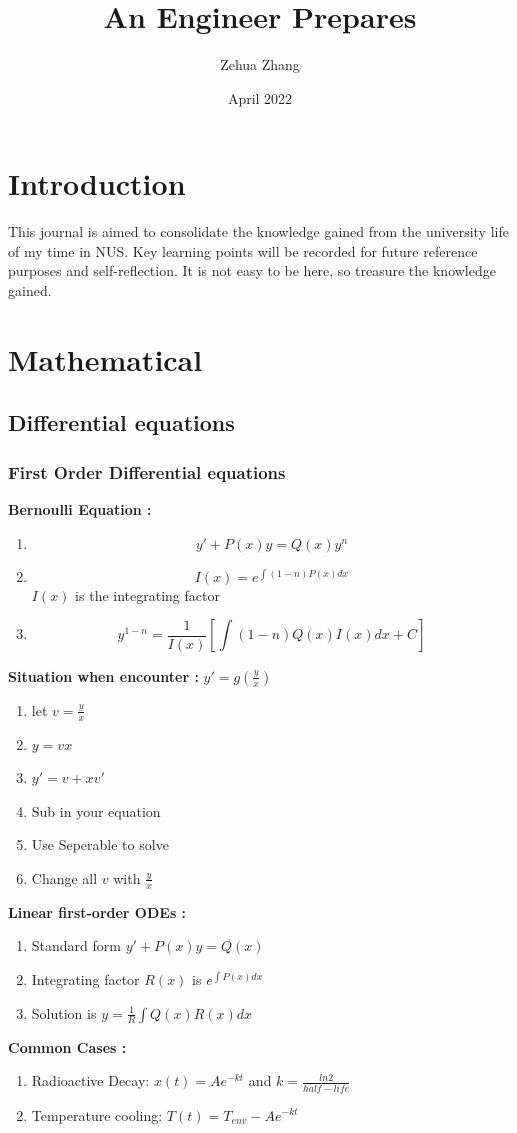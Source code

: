 \documentclass{article}
\title{An Engineer Prepares}
\author{Zehua Zhang}
\date{April 2022}
\begin{document}
\maketitle
\newpage
\tableofcontents

\newpage
\section*{Introduction}
This journal is aimed to consolidate the knowledge gained from the university life of my time in NUS. Key learning points will be recorded for future reference purposes and self-reflection. It is not easy to be here, so treasure the knowledge gained.


\section{Mathematical}
\subsection{Differential equations}
\subsubsection{First Order Differential equations}
\textbf{Bernoulli Equation :}
\begin{enumerate} 
    \item\[y'+ P(x)y = Q(x) y^n\]
    \item\[I(x)= e^{\int(1-n)P(x)dx}\]
$I(x)$ is the integrating factor
    \item\[y^{1-n}=\frac{1}{I(x)}\left[\int(1-n)Q(x)I(x)dx + C\right]\]
\end{enumerate}
\textbf{Situation when encounter :} $y'=g(\frac{y}{x})$
\begin{enumerate}
    \item let $v=\frac{y}{x}$
    \item $y = vx$
    \item $y'=v+xv'$
    \item Sub in your equation
    \item Use Seperable to solve
    \item Change all $v$ with $\frac{y}{x}$
\end{enumerate}
\textbf{Linear first-order ODEs :}\\
\begin{enumerate}
    \item Standard form $y'+P(x)y=Q(x)$
    \item Integrating factor $R(x)$ is $e^{\int{P(x)dx}}$
    \item Solution is $y = \frac{1}{R}\int{Q(x)R(x)}dx$
\end{enumerate}
\textbf{Common Cases :}
\begin{enumerate}
    \item Radioactive Decay: $x(t)=Ae^{-kt}$ and $k=\frac{ln2}{half-life}$
    \item Temperature cooling: $T(t)=T_{env}-Ae^{-kt}$
\end{enumerate}
\end{document}
